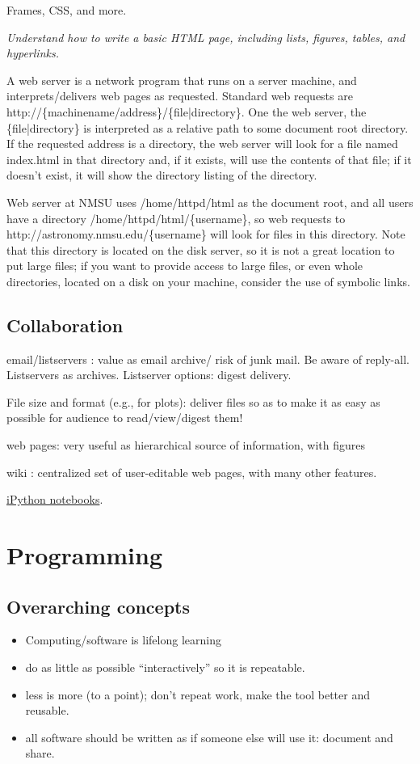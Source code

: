 \documentclass{article}
\newcommand{\test}[1]{%
    \begin{center}
        \colorbox{hl}{\parbox{0.9\textwidth}{\emph{#1}}}
    \end{center}}
\begin{document}
Frames, CSS, and more.

\test{Understand how to write a basic HTML page, including lists,
figures, tables, and hyperlinks.}

A web server is a network program that runs on a server machine, and
interprets/delivers web pages as requested. Standard web requests are
http://\{machinename/address\}/\{file|directory\}. One the web server, the
\{file|directory\} is interpreted as a relative path to some document
root directory. If the requested address is a directory, the web
server will look for a file named index.html in that directory and, if
it exists, will use the contents of that file; if it doesn't exist, it
will show the directory listing of the directory.

Web server at NMSU uses /home/httpd/html as the document root, and all
users have a directory /home/httpd/html/\{username\}, so web requests to
http://astronomy.nmsu.edu/\{username\} will look for files in this
directory. Note that this directory is located on the disk server, so
it is not a great location to put large files; if you want to provide
access to large files, or even whole directories, located on a disk on
your machine, consider the use of symbolic links.


\subsection{Collaboration}

email/listservers : value as email archive/ risk of junk mail. Be
aware of reply-all. Listservers as archives. Listserver options:
digest delivery.

File size and format (e.g., for plots): deliver files so as to make it
as easy as possible for audience to read/view/digest them!

web pages: very useful as hierarchical source of information, with
figures

wiki : centralized set of user-editable web pages, with many other
features\@.

\href{http://astronomy.nmsu.edu/holtz/a575/ipynb.html}
{iPython notebooks}.

\newpage
\section{Programming}
\subsection{Overarching concepts}
\begin{itemize}
    \item Computing/software is lifelong learning
    \item do as little as possible ``interactively'' so it is
        repeatable.
    \item less is more (to a point); don't repeat work, make the tool
        better and reusable.
    \item all software should be written as if someone else will use
        it: document and share.
\end{itemize}
\end{document}
